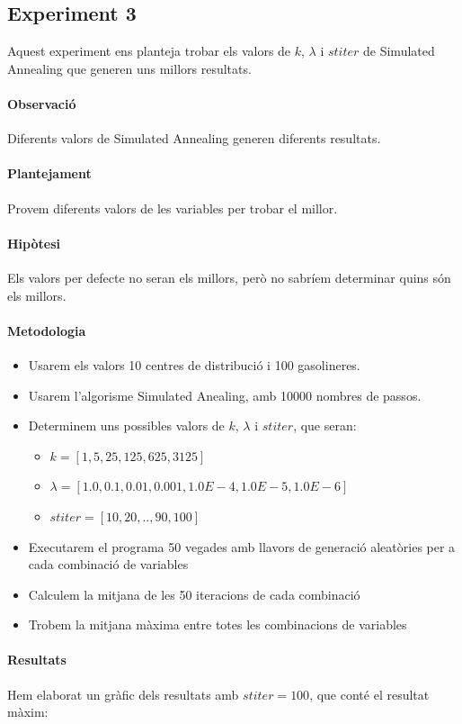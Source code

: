 \documentclass[a4paper]{article}
\begin{document}
\subsection{Experiment 3}
Aquest experiment ens planteja trobar els valors de $k$, $\lambda$ i $stiter$ de Simulated Annealing que generen uns millors resultats.
\paragraph{Observació} Diferents valors de Simulated Annealing generen diferents resultats.
\paragraph{Plantejament} Provem diferents valors de les variables per trobar el millor.
\paragraph{Hipòtesi} Els valors per defecte no seran els millors, però no sabríem determinar quins són els millors.
\paragraph{Metodologia}
\begin{itemize}
\item Usarem els valors 10 centres de distribució i 100 gasolineres.
\item Usarem l'algorisme Simulated Anealing, amb 10000 nombres de passos.
\item Determinem uns possibles valors de $k$, $\lambda$ i $stiter$, que seran:
\begin{itemize}
\item{$k = [1,5,25,125,625,3125]$}
\item{$\lambda = [1.0,0.1,0.01,0.001,1.0E-4,1.0E-5,1.0E-6]$}
\item{$stiter = [10,20,..,90,100]$}
\end{itemize}
\item Executarem el programa 50 vegades amb llavors de generació aleatòries per a cada combinació de variables
\item Calculem la mitjana de les 50 iteracions de cada combinació
\item Trobem la mitjana màxima entre totes les combinacions de variables
\end{itemize}

\paragraph{Resultats} Hem elaborat un gràfic dels resultats amb $stiter=100$, que conté el resultat màxim:
\end{document}
